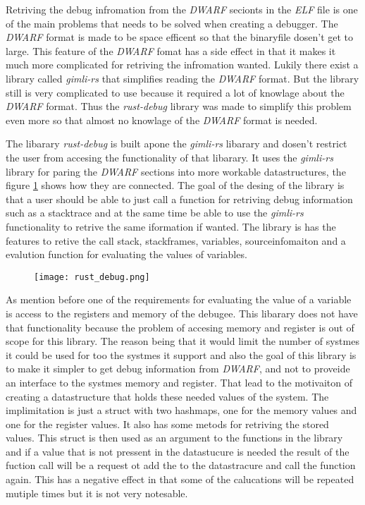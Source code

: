 
Retriving the debug infromation from the \emph{DWARF} secionts in the \emph{ELF} file is one of the main problems that needs to be solved when creating a debugger.
The \emph{DWARF} format is made to be space efficent so that the binaryfile dosen't get to large.
This feature of the \emph{DWARF} fomat has a side effect in that it makes it much more complicated for retriving the infromation wanted.
Lukily there exist a library called \emph{gimli-rs} that simplifies reading the \emph{DWARF} format.
But the library still is very complicated to use because it required a lot of knowlage about the \emph{DWARF} format.
Thus the \emph{rust-debug} library was made to simplify this problem even more so that almost no knowlage of the \emph{DWARF} format is needed.


The libarary \emph{rust-debug} is built apone the \emph{gimli-rs} libarary and dosen't restrict the user from accesing the functionality of that libarary.
It uses the \emph{gimli-rs} library for paring the \emph{DWARF} sections into more workable datastructures, the figure \ref{fig:rustdebug} shows how they are connected.
The goal of the desing of the library is that a user should be able to just call a function for retriving debug information such as a stacktrace and at the same time be able to use the \emph{gimli-rs} functionality to retrive the same iformation if wanted.
The library is has the features to retive the call stack, stackframes, variables, sourceinfomaiton and a evalution function for evaluating the values of variables.


\begin{figure}[h]
    \centering
    \texttt{[image: rust\_debug.png]}
    \label{fig:rustdebug}
\end{figure}


As mention before one of the requirements for evaluating the value of a variable is access to the registers and memory of the debugee.
This libarary does not have that functionality because the problem of accesing memory and register is out of scope for this library.
The reason being that it would limit the number of systmes it could be used for too the systmes it support and also the goal of this library is to make it simpler to get debug information from \emph{DWARF}, and not to proveide an interface to the systmes memory and register.
That lead to the motivaiton of creating a datastructure that holds these needed values of the system.
The implimitation is just a struct with two hashmaps, one for the memory values and one for the register values.
It also has some metods for retriving the stored values.
This struct is then used as an argument to the functions in the library and if a value that is not pressent in the datastucure is needed the result of the fuction call will be a request ot add the to the datastracure and call the function again.
This has a negative effect in that some of the calucations will be repeated mutiple times but it is not very notesable.


